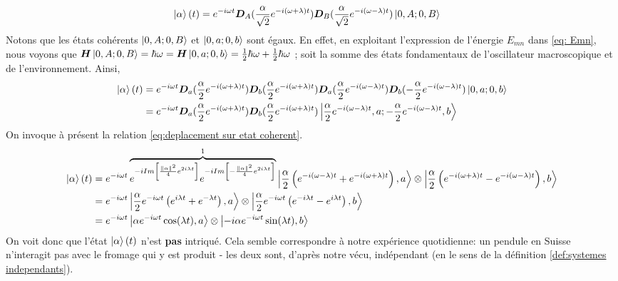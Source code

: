 \documentclass[11pt,oneside,a4paper]{article}
\newcommand{\h}{\ensuremath{\hbar}}
\begin{document}
\begin{align*}
  \ket{\alpha}(t) &= e^{-i\omega t}\bm{D}_A(\frac{\alpha}{\sqrt{2}}e^{-i\left(\omega+\lambda\right)t})\bm{D}_B(\frac{\alpha}{\sqrt{2}}e^{-i\left(\omega-\lambda\right)t})\ket{0,A;0,B}
\end{align*}
\color{purple} Notons que les états cohérents $\ket{0,A;0,B}$ et $\ket{0,a;0,b}$ sont égaux. En effet, en exploitant l'expression de l'énergie $E_{mn}$ dans \eqref{eq: Emn}, nous voyons que $\bm{H}\ket{0,A;0,B} = \h\omega = \bm{H}\ket{0,a;0,b} = \frac{1}{2}\h\omega+\frac{1}{2}\h\omega$ ; soit la somme des états fondamentaux de l'oscillateur macroscopique et de l'environnement. Ainsi, \color{black}
\begin{align*}
  \ket{\alpha}(t) &= e^{-i\omega t}\bm{D}_a(\frac{\alpha}{2}e^{-i\left(\omega+\lambda\right)t})\bm{D}_b(\frac{\alpha}{2}e^{-i\left(\omega+\lambda\right)t})\bm{D}_a(\frac{\alpha}{2}e^{-i\left(\omega-\lambda\right)t})\bm{D}_b(-\frac{\alpha}{2}e^{-i\left(\omega-\lambda\right)t})\ket{0,a;0,b}\\
  &= e^{-i\omega t}\bm{D}_a(\frac{\alpha}{2}e^{-i\left(\omega+\lambda\right)t})\bm{D}_b(\frac{\alpha}{2}e^{-i\left(\omega+\lambda\right)t})\ket{\frac{\alpha}{2}e^{-i\left(\omega-\lambda\right)t},a;-\frac{\alpha}{2}e^{-i\left(\omega-\lambda\right)t},b}
\end{align*}
On invoque à présent la relation \eqref{eq:deplacement sur etat coherent}.
\begin{align}
  \ket{\alpha}(t) &= e^{-i\omega t}\overbrace{e^{-iIm\left[\frac{\norm{\alpha}^2}{4}e^{2i\lambda t}\right]}e^{-iIm\left[-\frac{\norm{\alpha}^2}{4}e^{2i\lambda t}\right]}}^1\ket{\frac{\alpha}{2}\left(e^{-i\left(\omega-\lambda\right)t}+e^{-i\left(\omega+\lambda\right)t}\right),a}\otimes\ket{\frac{\alpha}{2}\left(e^{-i\left(\omega+\lambda\right)t}-e^{-i\left(\omega-\lambda\right)t}\right),b}\notag\\
  &= e^{-i\omega t}\ket{\frac{\alpha}{2}e^{-i\omega t}\left(e^{i\lambda t}+e^{-\lambda t}\right),a}\otimes\ket{\frac{\alpha}{2}e^{-i\omega t}\left(e^{-i\lambda t}-e^{i\lambda t}\right),b}\notag\\
  &= e^{-i\omega t}\ket{\alpha e^{-i\omega t}\cos(\lambda t),a}\otimes\ket{-i\alpha e^{-i\omega t}\sin(\lambda t),b}\label{eq:etat naif evolue}
\end{align}
On voit donc que l'état $\ket{\alpha}(t)$ n'est \textbf{pas} intriqué. Cela semble correspondre à notre expérience quotidienne: un pendule en Suisse n'interagit pas avec le fromage qui y est produit - les deux sont, d'après notre vécu, indépendant (en le sens de la définition \ref{def:systemes independants}).
\end{document}
